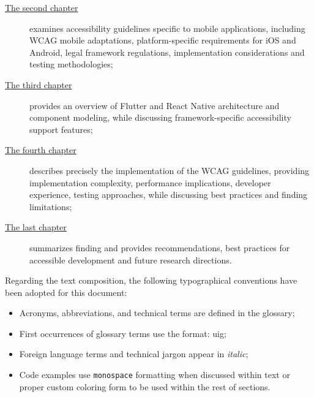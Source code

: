 \begin{description}
    \item[{\hyperref[chap:accessibility]{The second chapter}}]  examines accessibility guidelines specific to mobile applications, including WCAG mobile adaptations, platform-specific requirements for iOS and Android, legal framework regulations, implementation considerations and testing methodologies;
    
    \item[{\hyperref[chap:frameworks]{The third chapter}}] provides an overview of Flutter and React Native architecture and component modeling, while discussing framework-specific accessibility support features;
    
    \item[{\hyperref[chap:implementation]{The fourth chapter}}] describes precisely the implementation of the WCAG guidelines, providing implementation complexity, performance implications, developer experience, testing approaches, while discussing best practices and finding limitations;
    
    \item[{\hyperref[chap:conclusions]{The last chapter}}] summarizes finding and provides recommendations, best practices for accessible development and future research directions.
\end{description}

Regarding the text composition, the following typographical conventions have been adopted for this document:
\begin{itemize}
    \item Acronyms, abbreviations, and technical terms are defined in the glossary;
    \item First occurrences of glossary terms use the format: \gls{uig};
    \item Foreign language terms and technical jargon appear in \textit{italic};
    \item Code examples use \texttt{monospace} formatting when discussed within text or proper custom coloring form to be used within the rest of sections.
\end{itemize}

\newpage